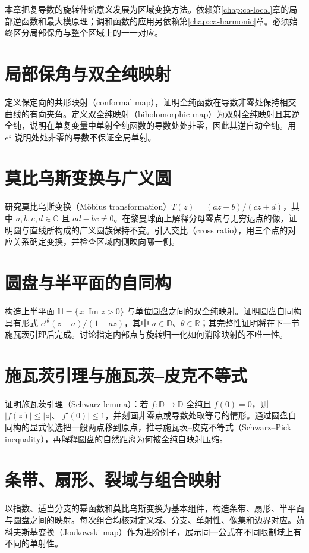 \documentclass[UTF8,12pt,a4paper,fontset=fandol]{ctexbook}
\begin{document}
本章把复导数的旋转伸缩意义发展为区域变换方法。依赖第\ref{chap:ca-local}章的局部逆函数和最大模原理；调和函数的应用另依赖第\ref{chap:ca-harmonic}章。必须始终区分局部保角与整个区域上的一一对应。

\section{局部保角与双全纯映射}
定义保定向的共形映射（conformal map），证明全纯函数在导数非零处保持相交曲线的有向夹角。定义双全纯映射（biholomorphic map）为双射全纯映射且其逆全纯，说明在单复变量中单射全纯函数的导数处处非零，因此其逆自动全纯。用 $e^z$ 说明处处非零的导数不保证全局单射。

\section{莫比乌斯变换与广义圆}
研究莫比乌斯变换（Möbius transformation）$T(z)=(az+b)/(cz+d)$，其中 $a,b,c,d\in\mathbb{C}$ 且 $ad-bc\ne0$。在黎曼球面上解释分母零点与无穷远点的像，证明圆与直线所构成的广义圆族保持不变。引入交比（cross ratio），用三个点的对应关系确定变换，并检查区域内侧映向哪一侧。

\section{圆盘与半平面的自同构}
构造上半平面 $\mathbb{H}=\{z:\operatorname{Im}z>0\}$ 与单位圆盘之间的双全纯映射。证明圆盘自同构具有形式 $e^{i\theta}(z-a)/(1-\overline a z)$，其中 $a\in\mathbb{D}$、$\theta\in\mathbb{R}$；其完整性证明将在下一节施瓦茨引理后完成。讨论指定内部点与旋转归一化如何消除映射的不唯一性。

\section{施瓦茨引理与施瓦茨--皮克不等式}
证明施瓦茨引理（Schwarz lemma）：若 $f:\mathbb{D}\to\mathbb{D}$ 全纯且 $f(0)=0$，则 $|f(z)|\le|z|$、$|f'(0)|\le1$，并刻画非零点或导数处取等号的情形。通过圆盘自同构的显式候选把一般两点移到原点，推导施瓦茨--皮克不等式（Schwarz--Pick inequality），再解释圆盘的自然距离为何被全纯自映射压缩。

\section{条带、扇形、裂域与组合映射}
以指数、适当分支的幂函数和莫比乌斯变换为基本组件，构造条带、扇形、半平面与圆盘之间的映射。每次组合均核对定义域、分支、单射性、像集和边界对应。茹科夫斯基变换（Joukowski map）作为进阶例子，展示同一公式在不同限制域上有不同的单射性。
\end{document}
